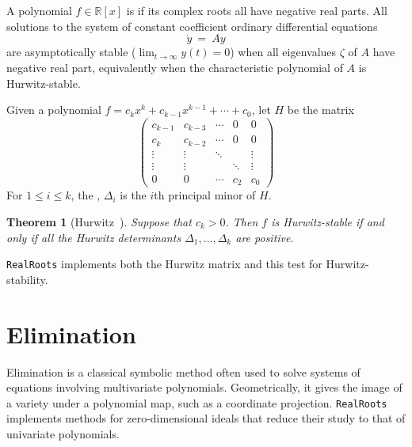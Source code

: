 \documentclass[12pt]{amsart}
\newtheorem{theorem}{Theorem}
\theoremstyle{definition}
\newcommand{\RR}{\mathbb{R}}
\newcommand{\defcolor}[1]{{\color{TAMU}#1}}
\newcommand{\demph}[1]{\defcolor{{\sl #1}}}
\begin{document}
A polynomial $f\in\RR[x]$ is \demph{Hurwitz-stable} if its complex roots all have negative real parts.
All solutions to the system of constant coefficient ordinary differential equations 
%
 \[
  \dot{y}\ =\ Ay
 \]
%
are asymptotically stable ($\lim_{t\to\infty}y(t)=0$) when all eigenvalues $\zeta$ of $A$ have negative real part,
equivalently when the characteristic polynomial of $A$ is Hurwitz-stable.
 
Given a polynomial $f=c_kx^k+c_{k-1}x^{k-1}+\dotsb+c_0$,  let \defcolor{$H$} be the matrix
\[
\left(\begin{matrix}
  c_{k-1} & c_{k-3} & \dotsb & 0  & 0 \\
  c_k    & c_{k-2} &  \dotsb& 0 & 0 \\
  \vdots & \vdots & \ddots&    &\vdots\\
  \vdots & \vdots & & \ddots&\vdots\\
    0    &    0   & \dotsb&c_2 & c_0
\end{matrix}\right)
\]
For $1\leq i\leq k$, the \demph{Hurwitz determinant}, \defcolor{$\Delta_i$} is the $i$th principal minor of $H$.


\begin{theorem}[Hurwitz~\cite{Hurwitz}]
  Suppose that $c_k>0$.
  Then $f$ is Hurwitz-stable if and only if all the Hurwitz determinants $\Delta_{1},\dots,\Delta_{k}$ are positive.
\end{theorem}

\texttt{RealRoots} implements both the Hurwitz matrix and this test for Hurwitz-stability.
%
\begin{leftbar}

\end{leftbar}
%



\section{Elimination}\label{S:two}

Elimination is a classical symbolic method often used to solve systems of equations involving multivariate polynomials.
Geometrically, it gives the image of a variety under a polynomial map, such as a coordinate projection.
\texttt{RealRoots} implements methods for zero-dimension\-al ideals that reduce their study to that of univariate polynomials.
\end{document}
